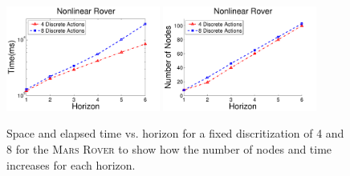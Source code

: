 \documentclass[twoside,11pt]{article}
\newcommand{\MarsRover}{\textsc{Mars Rover }}
\begin{document}
\begin{figure}[tbp!]
\vspace{2mm}
\centering
\includegraphics[width=0.45\textwidth]{Figures2/camdp/DisRoverNode.pdf}
\hspace{2mm}
\includegraphics[width=0.45\textwidth]{Figures2/camdp/DisRoverTime.pdf}
\vspace{-2mm}
\caption{%
Space and elapsed time vs. horizon for a fixed discritization of 4 and 8 for the \MarsRover to show how the number of nodes and time increases for each horizon. 
}
\label{fig:roverDisTS}
\vspace{-5mm}
\end{figure}
\end{document}
